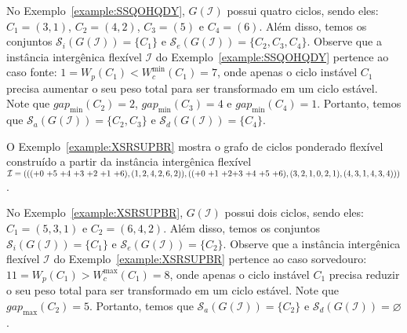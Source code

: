 

No Exemplo~\ref{example:SSQOHQDY}, $G(\mathcal{I})$ possui quatro ciclos, sendo eles: $C_1 = (3,1)$, $C_2 = (4,2)$, $C_3 = (5)$ e $C_4=(6)$. Além disso, temos os conjuntos $\mathcal{S}_i(G(\mathcal{I})) = \{C_1\}$ e $\mathcal{S}_e(G(\mathcal{I})) = \{C_2,C_3,C_4\}$. Observe que a instância intergênica flexível $\mathcal{I}$ do Exemplo~\ref{example:SSQOHQDY} pertence ao caso fonte: $1 = W_p(C_1) < W^{\min}_c(C_1) = 7$, onde apenas o ciclo instável $C_1$ precisa aumentar o seu peso total para ser transformado em um ciclo estável. Note que $gap_{\min}(C_2) = 2$, $gap_{\min}(C_3) = 4$ e $gap_{\min}(C_4) = 1$. Portanto, temos que $\mathcal{S}_a(G(\mathcal{I})) = \{C_2, C_3\}$ e $\mathcal{S}_d(G(\mathcal{I})) = \{C_4\}$.

O Exemplo~\ref{example:XSRSUPBR} mostra o grafo de ciclos ponderado flexível construído a partir da instância intergênica flexível $\mathcal{I} = ((({+0}~{+5}~{+4}~{+3}~{+2}~{+1}~{+6}),(1,2,4,2,6,2)),(({+0}~{+1}~{+2}\break{+3}~{+4}~{+5}~{+6}),(3,2,1,0,2,1),(4,3,1,4,3,4)))$.



No Exemplo~\ref{example:XSRSUPBR}, $G(\mathcal{I})$ possui dois ciclos, sendo eles: $C_1 = (5,3,1)$ e $C_2 = (6,4,2)$. Além disso, temos os conjuntos $\mathcal{S}_i(G(\mathcal{I})) = \{C_1\}$ e $\mathcal{S}_e(G(\mathcal{I})) = \{C_2\}$. Observe que a instância intergênica flexível $\mathcal{I}$ do Exemplo~\ref{example:XSRSUPBR} pertence ao caso sorvedouro: $11 = W_p(C_1) > W^{\max}_c(C_1) = 8$, onde apenas o ciclo instável $C_1$ precisa reduzir o seu peso total para ser transformado em um ciclo estável. Note que $gap_{\max}(C_2) = 5$. Portanto, temos que $\mathcal{S}_a(G(\mathcal{I})) = \{C_2\}$ e $\mathcal{S}_d(G(\mathcal{I})) = \varnothing$.